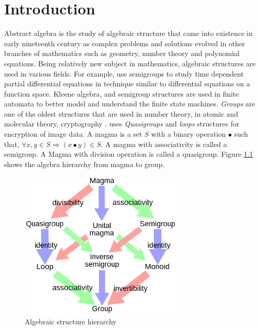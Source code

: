 \chapter{Introduction}
Abstract algebra is the study of algebraic structure that came into existence in
early nineteenth century as complex problems and solutions evolved in other
branches of mathematics such as geometry, number theory and polynomial
equations. Being relatively new subject in mathematics, algebraic structures are
used in various fields. For example, \cite{liaqat2021some} use semigroups
 to study time dependent partial
differential equations in technique similar to differential equations on a
function space. Kleene algebra, and semigroup structures are used in finite
automata to better model and understand the finite state machines.
\textit{Groups} are one of the oldest structures that are used in number theory,
in atomic and molecular theory, cryptography \cite{enwiki:1133598242}.
\cite{bruck1944some} uses \textit{Quasigroups} and \textit{loops} structures for
encryption of image data. A magma is a set $S$ with a binary operation $∙$ such
that, $\forall x,y \in S \Rightarrow (x ∙ y) \in S$. A magma with associativity
is called a semigroup. A Magma with division operation is called a quasigroup.
Figure \ref{fig_magma} shows the algebra hierarchy from magma to group. 
 \begin{figure}[ht]
	\centering
	\includegraphics[width=0.7\textwidth]{figures/Sample/Magma_to_group.jpg}
	\caption{Algebraic structure hierarchy \cite{enwiki:1107380309}}
	\label{fig_magma}
 \end{figure}

